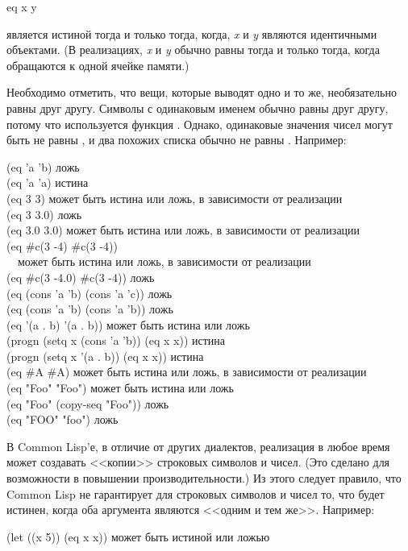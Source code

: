 \begin{defun}[Функция]
eq x y

 является истиной тогда и только тогда, когда,
\emph{x} и \emph{y} являются идентичными объектами.
(В реализациях, \emph{x} и \emph{y} обычно равны  тогда и только
тогда, когда обращаются к одной ячейке памяти.)

Необходимо отметить, что вещи, которые выводят одно и то же, необязательно равны
 друг другу. Символы с одинаковым именем обычно равны  друг
другу, потому что используется функция .
Однако, одинаковые значения чисел могут быть не равны , и два похожих
списка обычно не равны .
Например:
\begin{lisp}
(eq 'a 'b) \textrm{ложь} \\
(eq 'a 'a) \textrm{истина} \\
(eq 3 3) \textrm{может быть истина или ложь, в зависимости от реализации} \\
(eq 3 3.0) \textrm{ложь} \\
(eq 3.0 3.0) \textrm{может быть истина или ложь, в зависимости от реализации} \\
(eq \#c(3 -4) \#c(3 -4)) \\
~~\textrm{может быть истина или ложь, в зависимости от реализации} \\
(eq \#c(3 -4.0) \#c(3 -4)) \textrm{ложь} \\
(eq (cons 'a 'b) (cons 'a 'c)) \textrm{ложь} \\
(eq (cons 'a 'b) (cons 'a 'b)) \textrm{ложь} \\
(eq '(a . b) '(a . b)) \textrm{может быть истина или ложь} \\
(progn (setq x (cons 'a 'b)) (eq x x)) \textrm{истина} \\
(progn (setq x '(a . b)) (eq x x)) \textrm{истина} \\
(eq \#{\Xbackslash}A \#{\Xbackslash}A) \textrm{может быть истина или ложь, в зависимости от реализации} \\
(eq "Foo" "Foo") \textrm{может быть истина или ложь} \\
(eq "Foo" (copy-seq "Foo")) \textrm{ложь} \\
(eq "FOO" "foo") \textrm{ложь}
\end{lisp}

В Common Lisp'е, в отличие от других диалектов, реализация в любое время может
создавать <<копии>> строковых символов и чисел. (Это сделано для возможности в
повышении производительности.) Из этого следует правило,
что Common Lisp не гарантирует для строковых символов и чисел то, что 
будет истинен, когда оба аргумента являются <<одним и тем же>>.
Например:
\begin{lisp}
(let ((x 5)) (eq x x)) \textrm{может быть истиной или ложью}
\end{lisp}


\end{defun}
